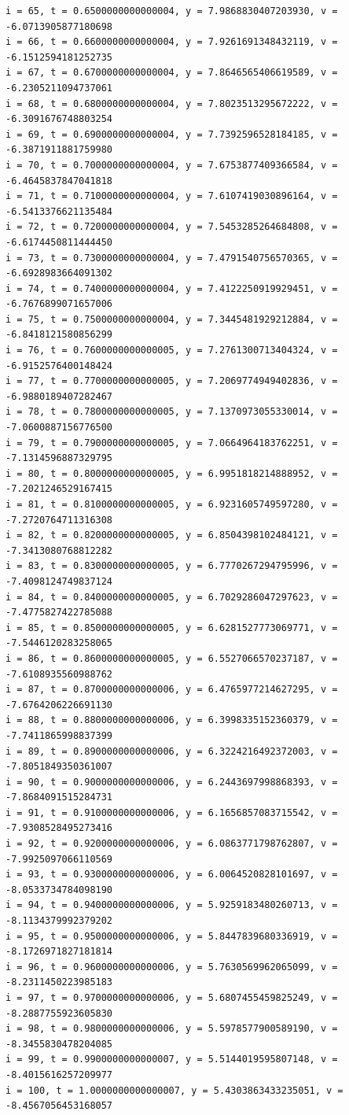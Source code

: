 \documentclass[a4j,titlepage]{jsarticle}
\begin{document}
\begin{lstlisting}[style=text,caption=課題7の実行結果,label=lst:kekka7]
i = 65, t = 0.6500000000000004, y = 7.9868830407203930, v = -6.0713905877180698
i = 66, t = 0.6600000000000004, y = 7.9261691348432119, v = -6.1512594181252735
i = 67, t = 0.6700000000000004, y = 7.8646565406619589, v = -6.2305211094737061
i = 68, t = 0.6800000000000004, y = 7.8023513295672222, v = -6.3091676748803254
i = 69, t = 0.6900000000000004, y = 7.7392596528184185, v = -6.3871911881759980
i = 70, t = 0.7000000000000004, y = 7.6753877409366584, v = -6.4645837847041818
i = 71, t = 0.7100000000000004, y = 7.6107419030896164, v = -6.5413376621135484
i = 72, t = 0.7200000000000004, y = 7.5453285264684808, v = -6.6174450811444450
i = 73, t = 0.7300000000000004, y = 7.4791540756570365, v = -6.6928983664091302
i = 74, t = 0.7400000000000004, y = 7.4122250919929451, v = -6.7676899071657006
i = 75, t = 0.7500000000000004, y = 7.3445481929212884, v = -6.8418121580856299
i = 76, t = 0.7600000000000005, y = 7.2761300713404324, v = -6.9152576400148424
i = 77, t = 0.7700000000000005, y = 7.2069774949402836, v = -6.9880189407282467
i = 78, t = 0.7800000000000005, y = 7.1370973055330014, v = -7.0600887156776500
i = 79, t = 0.7900000000000005, y = 7.0664964183762251, v = -7.1314596887329795
i = 80, t = 0.8000000000000005, y = 6.9951818214888952, v = -7.2021246529167415
i = 81, t = 0.8100000000000005, y = 6.9231605749597280, v = -7.2720764711316308
i = 82, t = 0.8200000000000005, y = 6.8504398102484121, v = -7.3413080768812282
i = 83, t = 0.8300000000000005, y = 6.7770267294795996, v = -7.4098124749837124
i = 84, t = 0.8400000000000005, y = 6.7029286047297623, v = -7.4775827422785088
i = 85, t = 0.8500000000000005, y = 6.6281527773069771, v = -7.5446120283258065
i = 86, t = 0.8600000000000005, y = 6.5527066570237187, v = -7.6108935560988762
i = 87, t = 0.8700000000000006, y = 6.4765977214627295, v = -7.6764206226691130
i = 88, t = 0.8800000000000006, y = 6.3998335152360379, v = -7.7411865998837399
i = 89, t = 0.8900000000000006, y = 6.3224216492372003, v = -7.8051849350361007
i = 90, t = 0.9000000000000006, y = 6.2443697998868393, v = -7.8684091515284731
i = 91, t = 0.9100000000000006, y = 6.1656857083715542, v = -7.9308528495273416
i = 92, t = 0.9200000000000006, y = 6.0863771798762807, v = -7.9925097066110569
i = 93, t = 0.9300000000000006, y = 6.0064520828101697, v = -8.0533734784098190
i = 94, t = 0.9400000000000006, y = 5.9259183480260713, v = -8.1134379992379202
i = 95, t = 0.9500000000000006, y = 5.8447839680336919, v = -8.1726971827181814
i = 96, t = 0.9600000000000006, y = 5.7630569962065099, v = -8.2311450223985183
i = 97, t = 0.9700000000000006, y = 5.6807455459825249, v = -8.2887755923605830
i = 98, t = 0.9800000000000006, y = 5.5978577900589190, v = -8.3455830478204085
i = 99, t = 0.9900000000000007, y = 5.5144019595807148, v = -8.4015616257209977
i = 100, t = 1.0000000000000007, y = 5.4303863433235051, v = -8.4567056453168057
\end{lstlisting}
\end{document}
